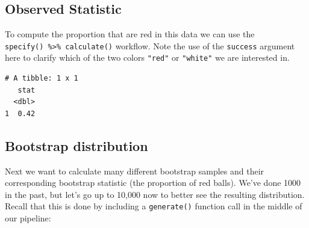 \documentclass[12pt, krantz2,]{krantz}
\makeatletter
\newenvironment{Shaded}{\begin{snugshade}}{\end{snugshade}}
\newcommand{\DataTypeTok}[1]{\textcolor[rgb]{0.27,0.27,0.27}{#1}}
\newcommand{\DecValTok}[1]{\textcolor[rgb]{0.06,0.06,0.06}{#1}}
\newcommand{\KeywordTok}[1]{\textcolor[rgb]{0.27,0.27,0.27}{\textbf{#1}}}
\newcommand{\NormalTok}[1]{#1}
\newcommand{\OperatorTok}[1]{\textcolor[rgb]{0.43,0.43,0.43}{\textbf{#1}}}
\newcommand{\OtherTok}[1]{\textcolor[rgb]{0.37,0.37,0.37}{#1}}
\newcommand{\StringTok}[1]{\textcolor[rgb]{0.5,0.5,0.5}{#1}}
\newenvironment{kframe}{%
\medskip{}
\setlength{\fboxsep}{.8em}
 \def\at@end@of@kframe{}%
 \ifinner\ifhmode%
  \def\at@end@of@kframe{\end{minipage}}%
  \begin{minipage}{\columnwidth}%
 \fi\fi%
 \def\FrameCommand##1{\hskip\@totalleftmargin \hskip-\fboxsep
 \colorbox{shadecolor}{##1}\hskip-\fboxsep
     \hskip-\linewidth \hskip-\@totalleftmargin \hskip\columnwidth}%
 \MakeFramed {\advance\hsize-\width
   \@totalleftmargin\z@ \linewidth\hsize
   \@setminipage}}%
 {\par\unskip\endMakeFramed%
 \at@end@of@kframe}
\renewenvironment{Shaded}{\begin{kframe}}{\end{kframe}}
\makeatother
\begin{document}
\hypertarget{observed-statistic}{%
\subsection{Observed Statistic}\label{observed-statistic}}

To compute the proportion that are red in this data we can use the \texttt{specify()\ \%\textgreater{}\%\ calculate()} workflow. Note the use of the \texttt{success} argument here to clarify which of the two colors \texttt{"red"} or \texttt{"white"} we are interested in.

\begin{Shaded}
\end{Shaded}

\begin{verbatim}
# A tibble: 1 x 1
   stat
  <dbl>
1  0.42
\end{verbatim}

\hypertarget{bootstrap-distribution-1}{%
\subsection{Bootstrap distribution}\label{bootstrap-distribution-1}}

Next we want to calculate many different bootstrap samples and their corresponding bootstrap statistic (the proportion of red balls). We've done 1000 in the past, but let's go up to 10,000 now to better see the resulting distribution. Recall that this is done by including a \texttt{generate()} function call in the middle of our pipeline:

\begin{Shaded}
\end{Shaded}
\end{document}
